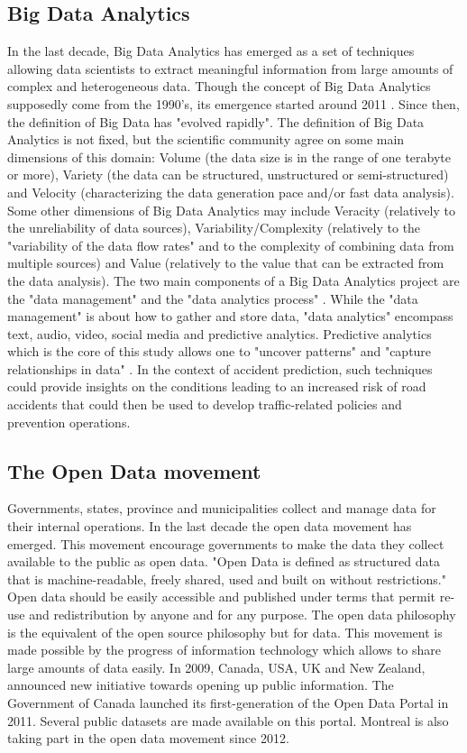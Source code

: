 \documentclass[conference]{IEEEtran}
\begin{document}
\subsection{Big Data Analytics}

In the last decade, Big Data Analytics has emerged as a set of techniques allowing data scientists to extract meaningful information from large amounts of complex and heterogeneous data. Though the concept of Big Data Analytics supposedly come from the 1990's, its emergence started around 2011 \cite{Gandomi2015}. Since then, the definition of Big Data has "evolved rapidly". The definition of Big Data Analytics is not fixed, but the scientific community agree on some main dimensions of this domain: Volume (the data size is in the range of one terabyte or more), Variety (the data can be structured, unstructured or semi-structured) and Velocity (characterizing the data generation pace and/or fast data analysis). Some other dimensions of Big Data Analytics may include Veracity (relatively to the unreliability of data sources), Variability/Complexity (relatively to the "variability of the data flow rates" and to the complexity of combining data from multiple sources) and Value (relatively to the value that can be extracted from the data analysis). The two main components of a Big Data Analytics project are the "data management" and the "data analytics process" \cite{Gandomi2015}. While the "data management" is about how to gather and store data, "data analytics" encompass text, audio, video, social media and predictive analytics. Predictive analytics which is the core of this study allows one to "uncover patterns" and "capture relationships in data" \cite{Gandomi2015}. In the context of accident prediction, such techniques could provide insights on the conditions leading to an increased risk of road accidents that could then be used to develop traffic-related policies and prevention operations. 

\subsection{The Open Data movement}

Governments, states, province and municipalities collect and manage data for their internal operations. In the last decade the open data movement has emerged. This movement encourage governments to make the data they collect available to the public as open data.
"Open Data is defined as structured data that is machine-readable, freely shared, used and built on without restrictions."\cite{opendata101} Open data should be easily accessible and published under terms that permit re-use and redistribution by anyone and for any purpose.
The open data philosophy is the equivalent of the open source philosophy but for data.
This movement is made possible by the progress of information technology which allows to share large amounts of data easily. In 2009, Canada, USA, UK and New Zealand, announced new initiative towards opening up public information. The Government of Canada launched its first-generation of the Open Data Portal in 2011.\cite{opendata101} Several public datasets are made available on this portal. Montreal is also taking part in the open data movement since 2012.
\end{document}
